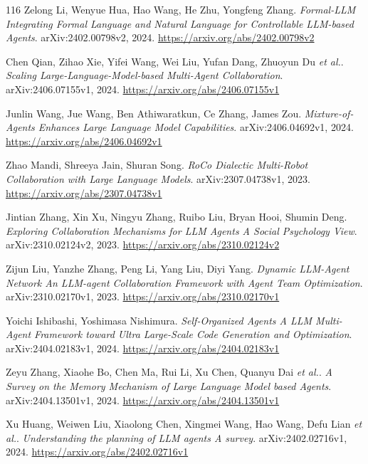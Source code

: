 \documentclass[11pt,a4paper]{article}
\begin{document}
\begin{thebibliography}{116}
Zelong Li, Wenyue Hua, Hao Wang, He Zhu, Yongfeng Zhang.
\newblock \emph{Formal-LLM Integrating Formal Language and Natural Language for Controllable LLM-based Agents}.
\newblock arXiv:2402.00798v2, 2024.
\newblock \url{https://arxiv.org/abs/2402.00798v2}

Chen Qian, Zihao Xie, Yifei Wang, Wei Liu, Yufan Dang, Zhuoyun Du \emph{et al.}.
\newblock \emph{Scaling Large-Language-Model-based Multi-Agent Collaboration}.
\newblock arXiv:2406.07155v1, 2024.
\newblock \url{https://arxiv.org/abs/2406.07155v1}

Junlin Wang, Jue Wang, Ben Athiwaratkun, Ce Zhang, James Zou.
\newblock \emph{Mixture-of-Agents Enhances Large Language Model Capabilities}.
\newblock arXiv:2406.04692v1, 2024.
\newblock \url{https://arxiv.org/abs/2406.04692v1}

Zhao Mandi, Shreeya Jain, Shuran Song.
\newblock \emph{RoCo Dialectic Multi-Robot Collaboration with Large Language Models}.
\newblock arXiv:2307.04738v1, 2023.
\newblock \url{https://arxiv.org/abs/2307.04738v1}

Jintian Zhang, Xin Xu, Ningyu Zhang, Ruibo Liu, Bryan Hooi, Shumin Deng.
\newblock \emph{Exploring Collaboration Mechanisms for LLM Agents A Social Psychology View}.
\newblock arXiv:2310.02124v2, 2023.
\newblock \url{https://arxiv.org/abs/2310.02124v2}

Zijun Liu, Yanzhe Zhang, Peng Li, Yang Liu, Diyi Yang.
\newblock \emph{Dynamic LLM-Agent Network An LLM-agent Collaboration Framework with Agent Team Optimization}.
\newblock arXiv:2310.02170v1, 2023.
\newblock \url{https://arxiv.org/abs/2310.02170v1}

Yoichi Ishibashi, Yoshimasa Nishimura.
\newblock \emph{Self-Organized Agents A LLM Multi-Agent Framework toward Ultra Large-Scale Code Generation and Optimization}.
\newblock arXiv:2404.02183v1, 2024.
\newblock \url{https://arxiv.org/abs/2404.02183v1}

Zeyu Zhang, Xiaohe Bo, Chen Ma, Rui Li, Xu Chen, Quanyu Dai \emph{et al.}.
\newblock \emph{A Survey on the Memory Mechanism of Large Language Model based Agents}.
\newblock arXiv:2404.13501v1, 2024.
\newblock \url{https://arxiv.org/abs/2404.13501v1}

Xu Huang, Weiwen Liu, Xiaolong Chen, Xingmei Wang, Hao Wang, Defu Lian \emph{et al.}.
\newblock \emph{Understanding the planning of LLM agents A survey}.
\newblock arXiv:2402.02716v1, 2024.
\newblock \url{https://arxiv.org/abs/2402.02716v1}


\end{thebibliography}
\end{document}
